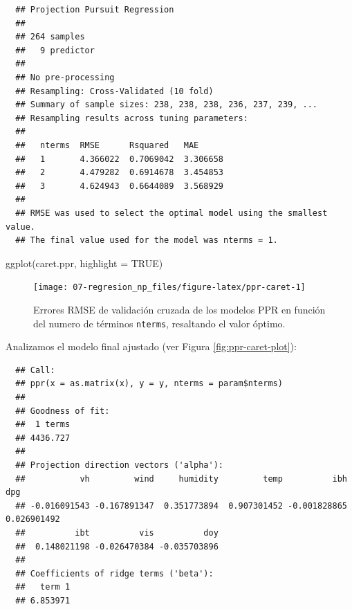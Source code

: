 \documentclass[
]{book}
\newenvironment{Shaded}{\begin{snugshade}}{\end{snugshade}}
\newcommand{\AttributeTok}[1]{\textcolor[rgb]{0.77,0.63,0.00}{#1}}
\newcommand{\ConstantTok}[1]{\textcolor[rgb]{0.00,0.00,0.00}{#1}}
\newcommand{\FunctionTok}[1]{\textcolor[rgb]{0.00,0.00,0.00}{#1}}
\newcommand{\NormalTok}[1]{#1}
\newcommand{\SpecialCharTok}[1]{\textcolor[rgb]{0.00,0.00,0.00}{#1}}
\theoremstyle{break}
\theoremstyle{nonumberplain}
\begin{document}
\begin{verbatim}
  ## Projection Pursuit Regression 
  ## 
  ## 264 samples
  ##   9 predictor
  ## 
  ## No pre-processing
  ## Resampling: Cross-Validated (10 fold) 
  ## Summary of sample sizes: 238, 238, 238, 236, 237, 239, ... 
  ## Resampling results across tuning parameters:
  ## 
  ##   nterms  RMSE      Rsquared   MAE     
  ##   1       4.366022  0.7069042  3.306658
  ##   2       4.479282  0.6914678  3.454853
  ##   3       4.624943  0.6644089  3.568929
  ## 
  ## RMSE was used to select the optimal model using the smallest value.
  ## The final value used for the model was nterms = 1.
\end{verbatim}

\begin{Shaded}
\begin{Highlighting}[]
\FunctionTok{ggplot}\NormalTok{(caret.ppr, }\AttributeTok{highlight =} \ConstantTok{TRUE}\NormalTok{)}
\end{Highlighting}
\end{Shaded}

\begin{figure}[!htb]

{\centering \texttt{[image: 07-regresion\_np\_files/figure-latex/ppr-caret-1]} 

}

\caption{Errores RMSE de validación cruzada de los modelos PPR en función del numero de términos \texttt{nterms}, resaltando el valor óptimo.}\label{fig:ppr-caret}
\end{figure}

Analizamos el modelo final ajustado (ver Figura \ref{fig:ppr-caret-plot}):



\begin{Shaded}
\end{Shaded}

\begin{verbatim}
  ## Call:
  ## ppr(x = as.matrix(x), y = y, nterms = param$nterms)
  ## 
  ## Goodness of fit:
  ##  1 terms 
  ## 4436.727 
  ## 
  ## Projection direction vectors ('alpha'):
  ##           vh         wind     humidity         temp          ibh          dpg 
  ## -0.016091543 -0.167891347  0.351773894  0.907301452 -0.001828865  0.026901492 
  ##          ibt          vis          doy 
  ##  0.148021198 -0.026470384 -0.035703896 
  ## 
  ## Coefficients of ridge terms ('beta'):
  ##   term 1 
  ## 6.853971
\end{verbatim}
\end{document}

